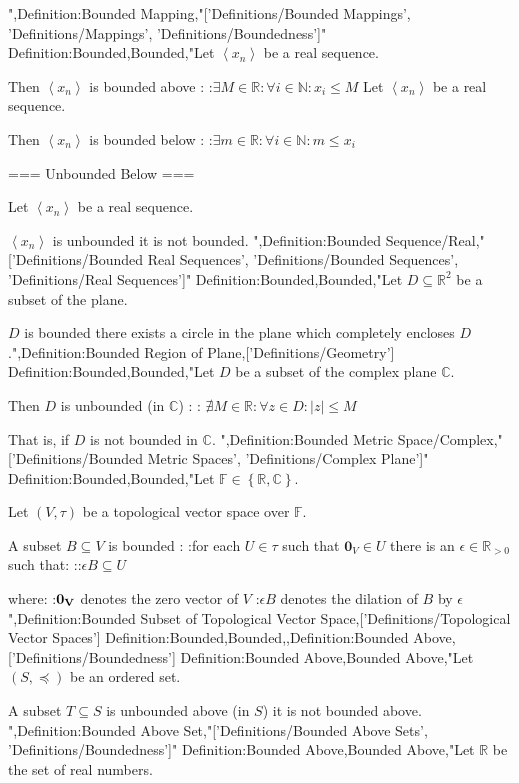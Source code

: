 ",Definition:Bounded Mapping,"['Definitions/Bounded Mappings', 'Definitions/Mappings', 'Definitions/Boundedness']"
Definition:Bounded,Bounded,"Let $\left\langle x_n \right\rangle$ be a real sequence.


Then $\left\langle x_n \right\rangle$ is bounded above :
:$\exists M \in \mathbb R: \forall i \in \mathbb N: x_i \le M$
Let $\left\langle x_n \right\rangle$ be a real sequence.


Then $\left\langle x_n \right\rangle$ is bounded below :
:$\exists m \in \mathbb R: \forall i \in \mathbb N: m \le x_i$


=== Unbounded Below ===

Let $\left\langle x_n \right\rangle$ be a real sequence.


$\left\langle x_n \right\rangle$ is unbounded  it is not bounded.
",Definition:Bounded Sequence/Real,"['Definitions/Bounded Real Sequences', 'Definitions/Bounded Sequences', 'Definitions/Real Sequences']"
Definition:Bounded,Bounded,"Let $D \subseteq \mathbb R^2$ be a subset of the plane.

$D$ is bounded  there exists a circle in the plane which completely encloses $D$.",Definition:Bounded Region of Plane,['Definitions/Geometry']
Definition:Bounded,Bounded,"Let $D$ be a subset of the complex plane $\mathbb C$.


Then $D$ is unbounded (in $\mathbb C$) :
: $\nexists M \in \mathbb R: \forall z \in D: \left\lvert z \right\rvert \le M$

That is, if $D$ is not bounded in $\mathbb C$.
",Definition:Bounded Metric Space/Complex,"['Definitions/Bounded Metric Spaces', 'Definitions/Complex Plane']"
Definition:Bounded,Bounded,"Let $\mathbb F \in \left\lbrace \mathbb R, \mathbb C \right\rbrace$.

Let $\left( V, \tau \right)$ be a topological vector space over $\mathbb F$.


A subset $B \subseteq V$ is bounded :
:for each $U \in \tau$ such that $\mathbf 0_V \in U$ there is an $\epsilon \in \mathbb R_{>0}$ such that:
::$\epsilon B \subseteq U$

where:
:$\bf 0_V$ denotes the zero vector of $V$
:$\epsilon B$ denotes the dilation of $B$ by $\epsilon$",Definition:Bounded Subset of Topological Vector Space,['Definitions/Topological Vector Spaces']
Definition:Bounded,Bounded,,Definition:Bounded Above,['Definitions/Boundedness']
Definition:Bounded Above,Bounded Above,"Let $\left( S, \preceq \right)$ be an ordered set.


A subset $T \subseteq S$ is unbounded above (in $S$)  it is not bounded above.
",Definition:Bounded Above Set,"['Definitions/Bounded Above Sets', 'Definitions/Boundedness']"
Definition:Bounded Above,Bounded Above,"Let $\mathbb R$ be the set of real numbers.


